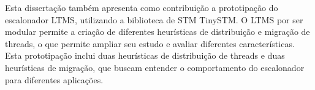 \documentclass[diss,capa]{texufpel}
\begin{document}


Esta dissertação também apresenta como contribuição a prototipação do escalonador LTMS, utilizando a biblioteca de STM TinySTM. O LTMS por ser modular permite a criação de diferentes heurísticas de distribuição e migração de threads, o que permite ampliar seu estudo e avaliar diferentes características. Esta prototipação inclui duas heurísticas de distribuição de threads e duas heurísticas de migração, que buscam entender o comportamento do escalonador para diferentes aplicações.
\end{document}
